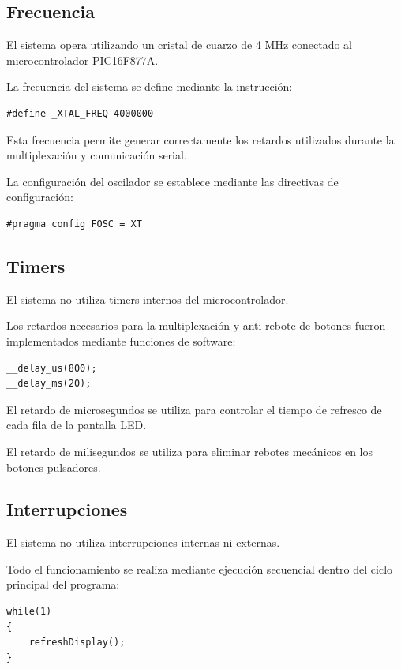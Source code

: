 \subsection{Frecuencia }

El sistema opera utilizando un cristal de cuarzo de 4 MHz conectado al microcontrolador PIC16F877A.

La frecuencia del sistema se define mediante la instrucción:

\begin{verbatim}
#define _XTAL_FREQ 4000000
\end{verbatim}

Esta frecuencia permite generar correctamente los retardos utilizados durante la multiplexación y comunicación serial.

La configuración del oscilador se establece mediante las directivas de configuración:

\begin{verbatim}
#pragma config FOSC = XT
\end{verbatim}

\subsection{Timers}

El sistema no utiliza timers internos del microcontrolador.

Los retardos necesarios para la multiplexación y anti-rebote de botones fueron implementados mediante funciones de software:

\begin{verbatim}
__delay_us(800);
__delay_ms(20);
\end{verbatim}

El retardo de microsegundos se utiliza para controlar el tiempo de refresco de cada fila de la pantalla LED.

El retardo de milisegundos se utiliza para eliminar rebotes mecánicos en los botones pulsadores.

\subsection{Interrupciones}

El sistema no utiliza interrupciones internas ni externas.

Todo el funcionamiento se realiza mediante ejecución secuencial dentro del ciclo principal del programa:

\begin{verbatim}
while(1)
{
    refreshDisplay();
}
\end{verbatim}

